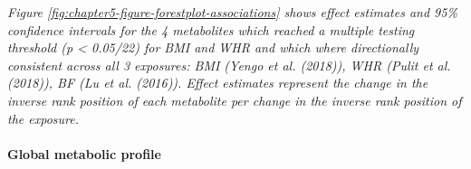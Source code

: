 \documentclass[11pt,twoside]{bristolthesis}
\newcommand{\bsmall}{\begin{small}}
\newcommand{\esmall}{\end{small}}
\begin{document}
\noindent 
\bsmall
\emph{Figure \ref{fig:chapter5-figure-forestplot-associations} shows effect estimates and 95\% confidence intervals for the 4 metabolites which reached a multiple testing threshold (p \textless{} 0.05/22) for BMI and WHR and which where directionally consistent across all 3 exposures: BMI (Yengo et al. (2018)), WHR (Pulit et al. (2018)), BF (Lu et al. (2016)). Effect estimates represent the change in the inverse rank position of each metabolite per change in the inverse rank position of the exposure.}
\esmall

\hypertarget{global-metabolic-profile}{%
\paragraph{Global metabolic profile}\label{global-metabolic-profile}}
\end{document}
